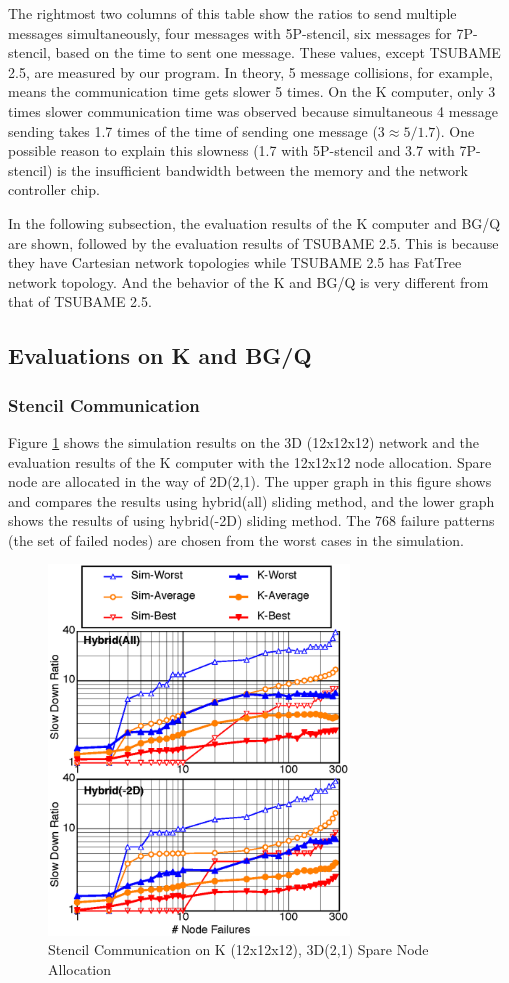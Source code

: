\documentclass[Afour,times,sageh]{sagej}
\begin{document}
The rightmost two columns of this table show the ratios to send
multiple messages simultaneously, four messages with 5P-stencil, six
messages for 7P-stencil, based on the time to sent one message. These
values, except TSUBAME 2.5, are measured by our program. In
theory, 5 message collisions, for example, means the communication
time gets slower 5 times. On the K computer, only 3 times
slower communication time was observed because simultaneous 4 message
sending takes 1.7 times of the time of sending one message ($3 \approx
5/1.7$)\citep{Hori-EuroMPI2015}. One possible reason to explain this
slowness (1.7 with 5P-stencil and 3.7 with 7P-stencil) is the
insufficient bandwidth between the memory and the network controller
chip.

In the following subsection, the evaluation results of the K computer
and BG/Q are shown, followed by the evaluation results of TSUBAME
2.5. This is because they have Cartesian network topologies
while TSUBAME 2.5 has FatTree network topology. And the behavior of
the K and BG/Q is very different from that of TSUBAME 2.5.

\subsection{Evaluations on K and BG/Q}

\subsubsection{Stencil Communication}

Figure \ref{fig:k-stencil} shows the simulation results on the
3D (12x12x12) network and the evaluation results of the K computer with
the 12x12x12 node allocation. Spare node are allocated in the way of
2D(2,1). The upper graph in this figure shows and compares the
results using hybrid(all) sliding method, and the lower graph shows
the results of using hybrid(-2D) sliding method. The 768 failure
patterns (the set of failed nodes) are chosen from the worst cases in
the simulation.

\begin{figure}[ht]
\centering
\includegraphics[width=80mm]{Figs/K-Stencil-CL.eps}
  \caption{Stencil Communication on K (12x12x12), 3D(2,1) Spare Node
    Allocation}
  \label{fig:k-stencil}
\end{figure}
\end{document}
